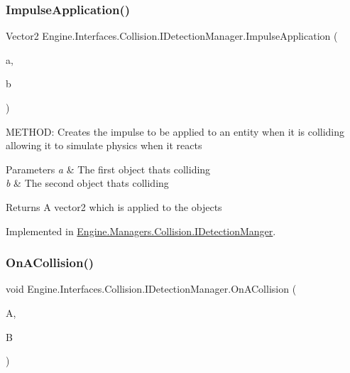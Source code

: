 \mbox{\label{a00430_a853912077b127d7e6779accc914df3cf}} 
\subsubsection{\texorpdfstring{Impulse\+Application()}{ImpulseApplication()}}
{\footnotesize\ttfamily Vector2 Engine.\+Interfaces.\+Collision.\+I\+Detection\+Manager.\+Impulse\+Application (\begin{DoxyParamCaption}\item[{\hyperlink{a00434}{I\+Hitbox}}]{a,  }\item[{\hyperlink{a00434}{I\+Hitbox}}]{b }\end{DoxyParamCaption})}



M\+E\+T\+H\+OD\+: Creates the impulse to be applied to an entity when it is colliding allowing it to simulate physics when it reacts 


\begin{DoxyParams}{Parameters}
{\em a} & The first object that\textquotesingle{}s colliding\\
\hline
{\em b} & The second object that\textquotesingle{}s colliding\\
\hline
\end{DoxyParams}
\begin{DoxyReturn}{Returns}
A vector2 which is applied to the objects
\end{DoxyReturn}


Implemented in \hyperlink{a00502_a47c9b58bdaf1f773ea3932f8c574ae0b}{Engine.\+Managers.\+Collision.\+I\+Detection\+Manger}.

\mbox{\label{a00430_ac0f8278b5b5a1c103da46f154ad088dc}} 
\subsubsection{\texorpdfstring{On\+A\+Collision()}{OnACollision()}}
{\footnotesize\ttfamily void Engine.\+Interfaces.\+Collision.\+I\+Detection\+Manager.\+On\+A\+Collision (\begin{DoxyParamCaption}\item[{\hyperlink{a00426}{I\+Collidable}}]{A,  }\item[{\hyperlink{a00426}{I\+Collidable}}]{B }\end{DoxyParamCaption})}



